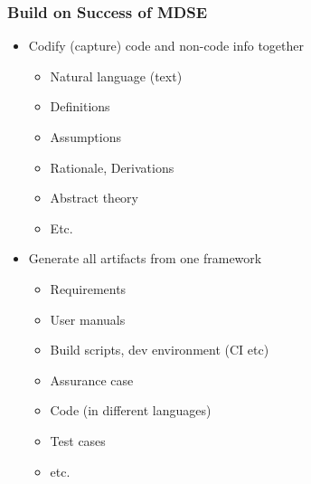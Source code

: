 \documentclass[usenames]{beamer}
\begin{document}
\begin{frame}

\frametitle{Build on Success of MDSE}

\begin{itemize}
  \item Codify (capture) code and non-code info together
  \begin{itemize}
    \item Natural language (text)
    \item Definitions
    \item Assumptions
    \item Rationale, Derivations
    \item Abstract theory
    \item Etc.
  \end{itemize}
\item Generate all artifacts from one framework
\begin{itemize}
  \item Requirements
  \item User manuals
  \item Build scripts, dev environment (CI etc)
  \item Assurance case
  \item Code (in different languages)
  \item Test cases
  \item etc.
\end{itemize}
\end{itemize}

\end{frame}
\end{document}

